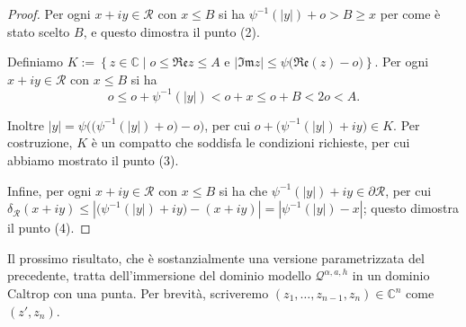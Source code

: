 \begin{proof}
    Per ogni $x+iy\in\mathcal{R}$ con $x\le B$ si ha $\psi^{-1}(|y|)+o>B \ge x$ per come è stato scelto $B$, e questo dimostra il punto (2).

    Definiamo $K:=\left\{z\in\mathbb{C}\mid o \le \mathfrak{Re}z\le A\text{ e }|\mathfrak{Im}z| \le \psi\big(\mathfrak{Re}(z)-o\big)\right\}$. Per ogni $x+iy\in\mathcal{R}$ con $x\le B$ si ha
    $$o \le o+\psi^{-1}(|y|) <o+x \le o+B<2o<A.$$

    Inoltre $|y|=\psi\Big(\big(\psi^{-1}(|y|)+o\big)-o\Big)$, per cui $o+\big(\psi^{-1}(|y|)+iy\big)\in K$. Per costruzione, $K$ è un compatto che soddisfa le condizioni richieste, per cui abbiamo mostrato il punto (3).

    Infine, per ogni $x+iy\in\mathcal{R}$ con $x\le B$ si ha che $\psi^{-1}(|y|)+iy\in\partial\mathcal{R}$, per cui $\delta_{\mathcal{R}}(x+iy) \le \left|\big(\psi^{-1}(|y|)+iy\big)-(x+iy)\right|=|\psi^{-1}(|y|)-x|$; questo dimostra il punto (4).
\end{proof}

Il prossimo risultato, che è sostanzialmente una versione parametrizzata del precedente, tratta dell'immersione del dominio modello $\mathcal{Q}^{\alpha,a,h}$ in un dominio Caltrop con una punta. Per brevità, scriveremo $(z_1,\dots,z_{n-1},z_n)\in\mathbb{C}^n$ come $(z',z_n)$.


